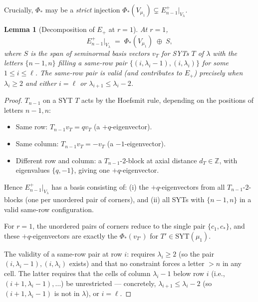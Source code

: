 \documentclass[11pt]{article}
\newtheorem{lemma}[theorem]{Lemma}
\theoremstyle{definition}
\begin{document}
Crucially, $\Phi_*$ may be a \emph{strict} injection
$\Phi_*(V_{\mu_1}) \subsetneq E_{n-1}^+|_{V_\lambda}$.

\begin{lemma}[Decomposition of $E_+$ at $r = 1$]\label{lem:E-decomp}
At $r = 1$,
\begin{equation}\label{eq:E-decomp}
   E_{n-1}^+|_{V_\lambda} \;=\; \Phi_*(V_{\mu_1}) \;\oplus\; S,
\end{equation}
where $S$ is the span of seminormal basis vectors $v_T$ for SYTs $T$
of $\lambda$ with the letters $\{n-1, n\}$ filling a same-row pair
$\{(i, \lambda_i - 1), (i, \lambda_i)\}$ for some $1 \le i \le \ell$.
The same-row pair is valid (and contributes to $E_+$) precisely when
$\lambda_i \ge 2$ and either $i = \ell$ or $\lambda_{i+1} \le \lambda_i - 2$.
\end{lemma}

\begin{proof}
$T_{n-1}$ on a SYT $T$ acts by the Hoefsmit rule, depending on the
positions of letters $n-1, n$:
\begin{itemize}[leftmargin=2em,topsep=0.2em,itemsep=0.1em]
\item Same row: $T_{n-1} v_T = q v_T$ (a $+q$-eigenvector).
\item Same column: $T_{n-1} v_T = -v_T$ (a $-1$-eigenvector).
\item Different row and column: a $T_{n-1}$-$2$-block at axial
distance $d_{T} \in \mathbb{Z}$, with eigenvalues $\{q, -1\}$, giving one
$+q$-eigenvector.
\end{itemize}
Hence $E_{n-1}^+|_{V_\lambda}$ has a basis consisting of:
(i) the $+q$-eigenvectors from all $T_{n-1}$-$2$-blocks (one per
unordered pair of corners), and
(ii) all SYTs with $\{n-1, n\}$ in a valid same-row configuration.

For $r = 1$, the unordered pairs of corners reduce to the single pair
$\{c_1, c_*\}$, and these $+q$-eigenvectors are exactly the
$\Phi_*(v_{T'})$ for $T' \in \mathrm{SYT}(\mu_1)$.

The validity of a same-row pair at row $i$: requires $\lambda_i \ge 2$
(so the pair $(i, \lambda_i{-}1), (i, \lambda_i)$ exists) and that no
constraint forces a letter $> n$ in any cell. The latter requires that
the cells of column $\lambda_i - 1$ below row $i$ (i.e., $(i+1, \lambda_i - 1),
\ldots$) be unrestricted — concretely, $\lambda_{i+1} \le \lambda_i - 2$
(so $(i+1, \lambda_i - 1)$ is not in $\lambda$), or $i = \ell$.
\end{proof}
\end{document}
